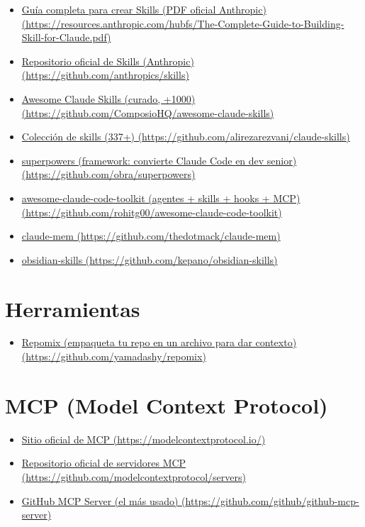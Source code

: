 \documentclass[11pt,a4paper]{report}
\begin{document}
\begin{itemize}
\item \href{https://resources.anthropic.com/hubfs/The-Complete-Guide-to-Building-Skill-for-Claude.pdf}{Guía completa para crear Skills (PDF oficial Anthropic) (\url{https://resources.anthropic.com/hubfs/The-Complete-Guide-to-Building-Skill-for-Claude.pdf})}
\item \href{https://github.com/anthropics/skills}{Repositorio oficial de Skills (Anthropic) (\url{https://github.com/anthropics/skills})}
\item \href{https://github.com/ComposioHQ/awesome-claude-skills}{Awesome Claude Skills (curado, +1000) (\url{https://github.com/ComposioHQ/awesome-claude-skills})}
\item \href{https://github.com/alirezarezvani/claude-skills}{Colección de skills (337+) (\url{https://github.com/alirezarezvani/claude-skills})}
\item \href{https://github.com/obra/superpowers}{superpowers (framework: convierte Claude Code en dev senior) (\url{https://github.com/obra/superpowers})}
\item \href{https://github.com/rohitg00/awesome-claude-code-toolkit}{awesome-claude-code-toolkit (agentes + skills + hooks + MCP) (\url{https://github.com/rohitg00/awesome-claude-code-toolkit})}
\item \href{https://github.com/thedotmack/claude-mem}{claude-mem (\url{https://github.com/thedotmack/claude-mem})}
\item \href{https://github.com/kepano/obsidian-skills}{obsidian-skills (\url{https://github.com/kepano/obsidian-skills})}
\end{itemize}

\section{Herramientas}

\begin{itemize}
\item \href{https://github.com/yamadashy/repomix}{Repomix (empaqueta tu repo en un archivo para dar contexto) (\url{https://github.com/yamadashy/repomix})}
\end{itemize}

\section{MCP (Model Context Protocol)}

\begin{itemize}
\item \href{https://modelcontextprotocol.io/}{Sitio oficial de MCP (\url{https://modelcontextprotocol.io/})}
\item \href{https://github.com/modelcontextprotocol/servers}{Repositorio oficial de servidores MCP (\url{https://github.com/modelcontextprotocol/servers})}
\item \href{https://github.com/github/github-mcp-server}{GitHub MCP Server (el más usado) (\url{https://github.com/github/github-mcp-server})}
\end{itemize}
\end{document}
